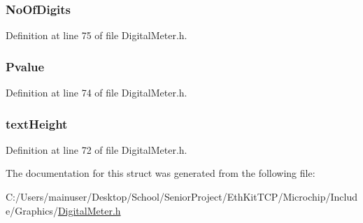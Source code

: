 \subsubsection[{No\+Of\+Digits}]{ No\+Of\+Digits}\label{struct_d_i_g_i_t_a_l_m_e_t_e_r_a5d4b34b0970e042684ba6b74c435b834}


Definition at line 75 of file Digital\+Meter.\+h.

\hypertarget{struct_d_i_g_i_t_a_l_m_e_t_e_r_ae00862ee1a0994073ae54ceddebcfb15}{}
\subsubsection[{Pvalue}]{ Pvalue}\label{struct_d_i_g_i_t_a_l_m_e_t_e_r_ae00862ee1a0994073ae54ceddebcfb15}


Definition at line 74 of file Digital\+Meter.\+h.

\hypertarget{struct_d_i_g_i_t_a_l_m_e_t_e_r_a40fa9c35391b0005032180b85e7afd34}{}
\subsubsection[{text\+Height}]{ text\+Height}\label{struct_d_i_g_i_t_a_l_m_e_t_e_r_a40fa9c35391b0005032180b85e7afd34}


Definition at line 72 of file Digital\+Meter.\+h.



The documentation for this struct was generated from the following file\+:\begin{DoxyCompactItemize}
\item 
C\+:/\+Users/mainuser/\+Desktop/\+School/\+Senior\+Project/\+Eth\+Kit\+T\+C\+P/\+Microchip/\+Include/\+Graphics/\hyperlink{_digital_meter_8h}{Digital\+Meter.\+h}\end{DoxyCompactItemize}

